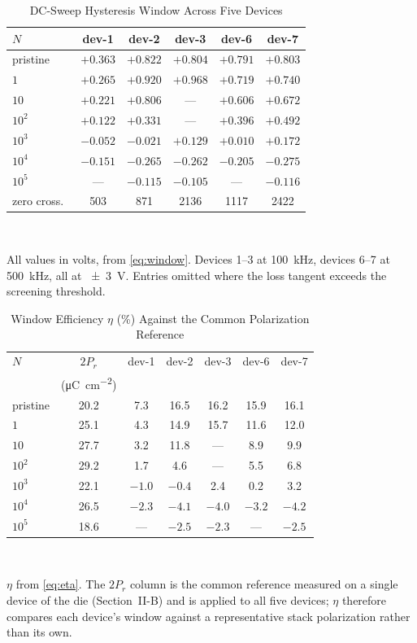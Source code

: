 \documentclass[journal]{IEEEtran}
\newcommand{\rev}[1]{#1}                    %
\newcommand{\Prem}{P_r}
\newcommand{\ucm}{\micro\coulomb\per\centi\meter\squared}
\begin{document}
\begin{table}[!t]
\caption{\rev{DC-Sweep Hysteresis Window Across Five Devices}}
\label{tab:window}\centering\footnotesize\setlength{\tabcolsep}{4pt}
\begin{tabular}{lccccc}
\toprule
$N$ & dev-1 & dev-2 & dev-3 & dev-6 & dev-7\\
\midrule
pristine & $+0.363$ & $+0.822$ & $+0.804$ & $+0.791$ & $+0.803$\\
$1$      & $+0.265$ & $+0.920$ & $+0.968$ & $+0.719$ & $+0.740$\\
$10$     & $+0.221$ & $+0.806$ & ---      & $+0.606$ & $+0.672$\\
$10^2$   & $+0.122$ & $+0.331$ & ---      & $+0.396$ & $+0.492$\\
$10^3$   & $-0.052$ & $-0.021$ & $+0.129$ & $+0.010$ & $+0.172$\\
$10^4$   & $-0.151$ & $-0.265$ & $-0.262$ & $-0.205$ & $-0.275$\\
$10^5$   & ---      & $-0.115$ & $-0.105$ & ---      & $-0.116$\\
\midrule
zero cross.\ & 503 & 871 & 2136 & 1117 & 2422\\
\bottomrule
\end{tabular}\\[2pt]
\parbox{\columnwidth}{\scriptsize All values in volts, from
\eqref{eq:window}. Devices 1--3 at \SI{100}{\kilo\hertz}, devices 6--7
at \SI{500}{\kilo\hertz}, all at \SI{\pm3}{\volt}. Entries omitted where
the loss tangent exceeds the screening threshold.}
\end{table}

\begin{table}[!t]
\caption{\rev{Window Efficiency $\eta$ (\%) Against the Common
Polarization Reference}}
\label{tab:eta}\centering\footnotesize\setlength{\tabcolsep}{4pt}
\begin{tabular}{lcccccc}
\toprule
$N$ & $2\Prem$ & dev-1 & dev-2 & dev-3 & dev-6 & dev-7\\
    & (\si{\ucm}) & & & & &\\
\midrule
pristine & 20.2 & 7.3 & 16.5 & 16.2 & 15.9 & 16.1\\
$1$      & 25.1 & 4.3 & 14.9 & 15.7 & 11.6 & 12.0\\
$10$     & 27.7 & 3.2 & 11.8 & ---  & 8.9  & 9.9\\
$10^2$   & 29.2 & 1.7 & 4.6  & ---  & 5.5  & 6.8\\
$10^3$   & 22.1 & $-1.0$ & $-0.4$ & 2.4 & 0.2 & 3.2\\
$10^4$   & 26.5 & $-2.3$ & $-4.1$ & $-4.0$ & $-3.2$ & $-4.2$\\
$10^5$   & 18.6 & ---    & $-2.5$ & $-2.3$ & ---    & $-2.5$\\
\bottomrule
\end{tabular}\\[2pt]
\parbox{\columnwidth}{\scriptsize $\eta$ from \eqref{eq:eta}. The
$2\Prem$ column is the common reference measured on a single device of
the die (Section~II-B) and is applied to all five devices; $\eta$
therefore compares each device's window against a representative stack
polarization rather than its own.}
\end{table}
\end{document}
